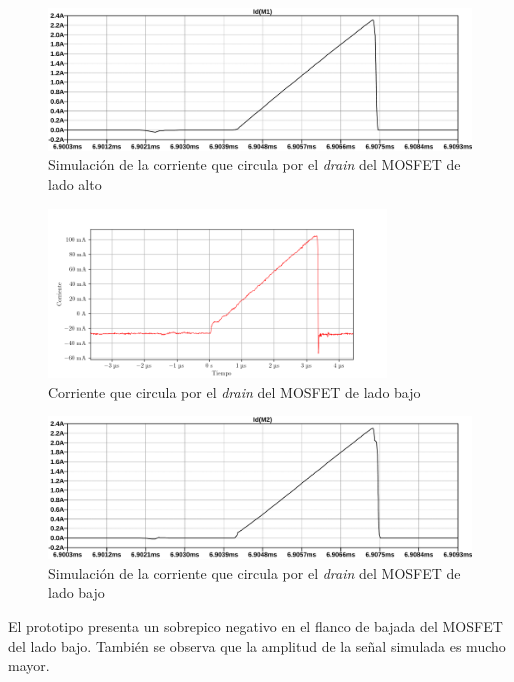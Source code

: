 \begin{figure}[H]
    \centering
    \includegraphics[width=\textwidth]{images/sim/10.pdf}
    \caption{Simulación de la corriente que circula por el \textit{drain} del MOSFET de lado alto}
    \label{fig:sim:10}
\end{figure}

\begin{figure}[H]
    \centering
    \includegraphics[width=0.8\textwidth]{images/capturas-osciloscopio/17-11-2022/22.png}
    \caption{Corriente que circula por el \textit{drain} del MOSFET de lado bajo}
    \label{fig:osc:22}
\end{figure}

\begin{figure}[H]
    \centering
    \includegraphics[width=\textwidth]{images/sim/11.pdf}
    \caption{Simulación de la corriente que circula por el \textit{drain} del MOSFET de lado bajo}
    \label{fig:sim:11}
\end{figure}

El prototipo presenta un sobrepico negativo en el flanco de bajada del MOSFET del lado bajo. 
También se observa que la amplitud de la señal simulada es mucho mayor.

